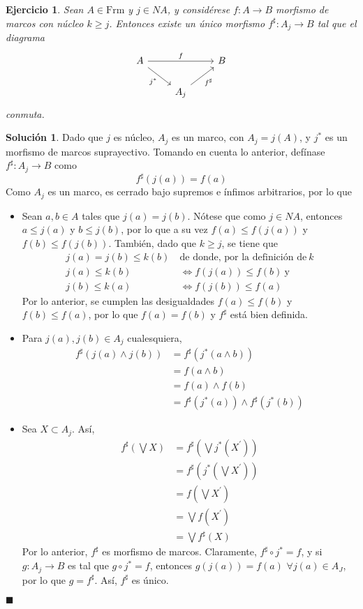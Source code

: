 \documentclass[12pt,letterpaper,titlepage]{article}
\newcommand{\xqed}[1]{%
  \leavevmode\unskip\penalty9999 \hbox{}\nobreak\hfill
  \quad\hbox{\ensuremath{#1}}}
\newtheorem{exe}{Ejercicio}
\theoremstyle{definition}
\newtheorem*{soltemp}{Solución}
\newenvironment{sol}[1]{%
    \begin{soltemp}#1}{%
    \xqed{\blacksquare}\end{soltemp}%
}
\newcommand\Sup{\bigvee}
\renewcommand\inf{\wedge}
\newcommand\<{\langle}
\renewcommand\>{\rangle}
\newcommand{\Frm}{\mathrm{Frm}}
\begin{document}
\begin{exe}%
Sean $A\in \Frm$ y $j\in NA$, y considérese $f:A\to B$ morfismo de marcos con núcleo $k\geq j$. Entonces existe un único morfismo $f^{\sharp}:A_j \to B$ tal que el diagrama
    \[
        \begin{tikzcd}
            A \ar[rr,"f"] \ar[dr,"j^*"'] &&  B \\
            &A_j \ar[ur,"f^\sharp"']
        \end{tikzcd}
    \]
conmuta.
\end{exe}
\begin{sol}
    Dado que $j$ es núcleo, $A_j$ es un marco, con $A_j=j(A)$, y $j^*$ es un morfismo de marcos suprayectivo. Tomando en cuenta lo anterior, defínase $f^\sharp:A_j\to B$ como
    $$f^\sharp(j(a))=f(a)$$
    Como $A_j$ es un marco, es cerrado bajo supremos e ínfimos arbitrarios, por lo que 
    \begin{itemize}
    \item Sean $a,b\in A$ tales que $j(a)=j(b)$. Nótese que como $j\in NA$, entonces $a\leq j(a)$ y $b\leq j(b)$, por lo que a su vez $f(a)\leq f(j(a))$ y $f(b)\leq f(j(b))$. También, dado que $k\geq j$, se tiene que
    \begin{align*}
        j(a)=j(b)\leq k(b) \ & \text{de donde, por la definición de} \ k\\
         j(a)\leq k(b) & \iff f(j(a))\leq f(b) \ \text{y}\\
        j(b)\leq k(a)&\iff f(j(b))\leq f(a)
    \end{align*}
    Por lo anterior, se cumplen las desigualdades 
    $f(a)\leq f(b)$ y $f(b)\leq f(a)$, por lo que $f(a)=f(b)$ y $f^\sharp$ está bien definida.
    \item Para $j(a), j(b) \in A_j$ cualesquiera, 
    \begin{align*}
    f^\sharp(j(a)\inf j(b))&=f^\sharp(j^*(a\inf b))\\
    &=f(a\inf b)\\
    &=f(a)\inf f(b)\\
    &=f^\sharp(j^*(a))\inf f^\sharp(j^*(b))
    \end{align*}
    \item Sea $X\subset A_j$. Así, 
    \begin{align*}
        f^\sharp(\Sup X)&=f^\sharp(\Sup j^*(X^\prime))\\
        &=f^\sharp(j^*(\Sup X^\prime))\\
        &=f(\Sup X^\prime)\\
        &=\Sup f(X^\prime)\\
        &=\Sup f^\sharp(X)
    \end{align*}
    Por lo anterior, $f^\sharp$ es morfismo de marcos. Claramente, $f^\sharp\circ j^*=f$, y si $g:A_j\to B$ es tal que $g\circ j^*=f$, entonces $g(j(a))=f(a)$ $\forall j(a)\in A_J$, por lo que $g=f^\sharp$. Así, $f^\sharp$ es único.
    \end{itemize}
\end{sol}
\end{document}

